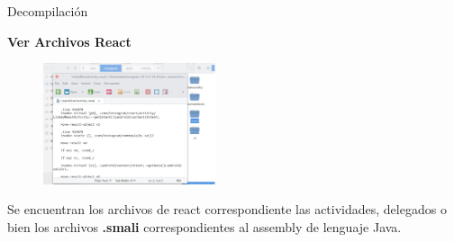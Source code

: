 \begin{frame}[t,fragile]{Decompilación}

\textbf{Ver Archivos React}

\begin{figure} 
\vspace{2pt}
  \begin{center}
    \includegraphics[width=0.45\textwidth]{react.png}
    \label{fig:databaseUserTable}
  \end{center}
  \vspace{2pt}
\end{figure} 

\bigskip

 Se encuentran los archivos de react correspondiente las actividades, delegados o bien los archivos \textbf{.smali} correspondientes al assembly de lenguaje Java.

\end{frame}